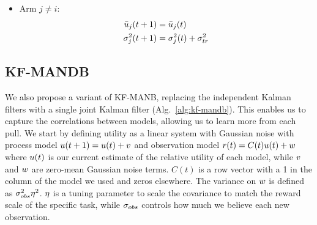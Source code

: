 \begin{algorithm}[t]
\begin{algorithmic}
{\begin{enumerate}
{\begin{itemize}
{                            }
                            \item{Arm $j \neq i$:
                                \begin{align*}
                                    \bar {u}_j(t+1)      &= \bar {u}_j(t) \\
                                    \sigma_j^2(t+1) &= \sigma^2_j(t) + \sigma_{tr}^2
                                \end{align*}
                            }
                        \end{itemize}
                    }
                \end{enumerate}}
        \EndFor
    \end{algorithmic}
\end{algorithm}


\subsection{KF-MANDB}
We also propose a variant of KF-MANB, replacing the independent Kalman filters with a single joint Kalman filter (Alg.~\ref{alg:kf-mandb}). This enables us to capture the correlations between models, allowing us to learn more from each pull. We start by defining utility as a linear system with Gaussian noise with process model $u(t+1) = u(t) + v$ and observation model $r(t) = C(t)u(t) + w$ where $u(t)$ is our current estimate of the relative utility of each model, while $v$ and $w$ are zero-mean Gaussian noise terms. $C(t)$ is a row vector with a 1 in the column of the model we used and zeros elsewhere. The variance on $w$ is defined as $\sigma_{obs}^2 \eta^2$. $\eta$ is a tuning parameter to scale the covariance to match the reward scale of the specific task, while $\sigma_{obs}$ controls how much we believe each new observation.

